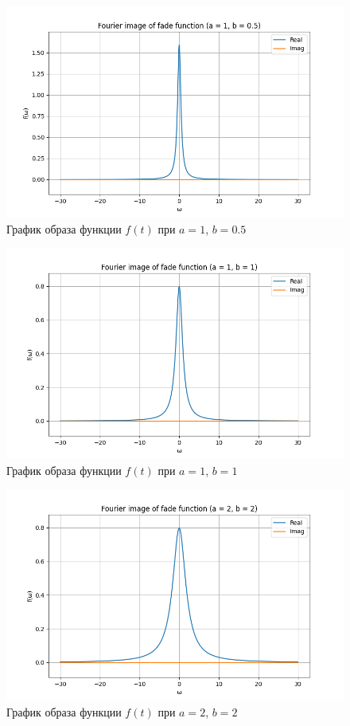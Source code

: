 \begin{figure}[ht!]
    \centering
    \includegraphics[width=\textwidth]{media/fade_1_image.png}
    \caption{График образа функции $f(t)$ при $a = 1$, $b = 0.5$}
    \label{fig:fade_1_image}
\end{figure}

\begin{figure}[ht!]
    \centering
    \includegraphics[width=\textwidth]{media/fade_2_image.png}
    \caption{График образа функции $f(t)$ при $a = 1$, $b = 1$}
    \label{fig:fade_2_image}
\end{figure}

\begin{figure}[ht!]
    \centering
    \includegraphics[width=\textwidth]{media/fade_3_image.png}
    \caption{График образа функции $f(t)$ при $a = 2$, $b = 2$}
    \label{fig:fade_3_image}
\end{figure}

